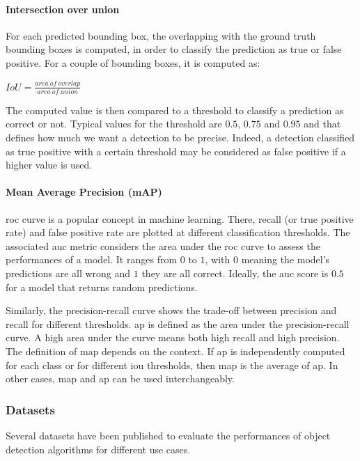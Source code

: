\documentclass[%
    corpo=12pt,
    twoside,
    stile=classica,   
    tipotesi=magistrale,
    evenboxes,
    english
]{toptesi}
\begin{document}
\paragraph{Intersection over union}
For each predicted bounding box, the overlapping with the ground truth bounding boxes is computed, in order to classify the prediction as true or false positive. For a couple of bounding boxes, it is computed as:
\begin{center}
	$IoU = \frac{area\ of\ overlap}{area\ of\ union}$
\end{center}
The computed value is then compared to a threshold to classify a prediction as correct or not. Typical values for the threshold are $0.5$, $0.75$ and $0.95$ and that defines how much we want a detection to be precise. Indeed, a detection classified as true positive with a certain threshold may be considered as false positive if a higher value is used.

\paragraph{Mean Average Precision (mAP)}
\gls{roc} curve is a popular concept in machine learning. There, recall (or true positive rate) and false positive rate are plotted at different classification thresholds. The associated \gls{auc} metric considers the area under the \gls{roc} curve to assess the performances of a model.\cite{roc} It ranges from $ 0 $ to $ 1 $, with $ 0 $ meaning the model's predictions are all wrong and $ 1 $ they are all correct. Ideally, the \gls{auc} score is $ 0.5 $ for a model that returns random predictions.

Similarly, the precision-recall curve shows the trade-off between precision and recall for different thresholds\cite{precrecall}. \gls{ap} is defined as the area under the precision-recall curve. A high area under the curve means both high recall and high precision. The definition of \gls{map} depends on the context. If \gls{ap} is independently computed for each class or for different \gls{iou} thresholds, then \gls{map} is the average of \gls{ap}. In other cases, \gls{map} and \gls{ap} can be used interchangeably.


\subsubsection{Datasets}\label{sec:datasets}
Several datasets have been published to evaluate the performances of object detection algorithms for different use cases.
\end{document}
